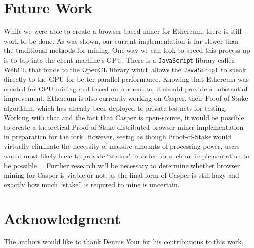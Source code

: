 \documentclass[runningheads]{llncs}
\begin{document}

\section{Future Work}
While we were able to create a browser based miner for Ethereum, there is still work to be done. As was shown, our current implementation is far slower than the traditional methods for mining. One way we can look to speed this process up is to tap into the client machine's GPU. There is a \verb|JavaScript| library called WebCL that binds to the OpenCL library which allows the \verb|JavaScript| to speak directly to the GPU for better parallel performance. Knowing that Ethereum was created for GPU mining and based on our results, it should provide a substantial improvement. 
Ethereum is also currently working on Casper, their Proof-of-Stake algorithm, which has already been deployed to private testnets for testing. Working with that and the fact that Casper is open-source, it would be possible to create a theoretical Proof-of-Stake distributed browser miner implementation in preparation for the fork. However, seeing as though Proof-of-Stake would virtually eliminate the necessity of massive amounts of processing power, users would most likely have to provide ``stakes" in order for such an implementation to be possible ~\cite{PoSproof}. Further research will be necessary to determine whether browser mining for Casper is viable or not, as the final form of Casper is still hazy and exactly how much ``stake'' is required to mine is uncertain.




\section*{Acknowledgment}
The authors would like to thank Dennis Your for his contributions to this work.
\end{document}
